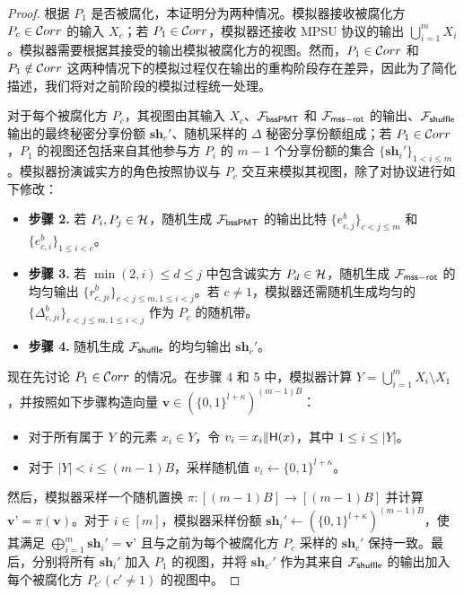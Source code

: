 \begin{proof}
根据 $P_1$ 是否被腐化，本证明分为两种情况。模拟器接收被腐化方 $P_c \in \mathcal{C}orr$ 的输入 $X_c$；若 $P_1 \in \mathcal{C}orr$，模拟器还接收 MPSU 协议的输出 $\bigcup_{i=1}^m X_i$。模拟器需要根据其接受的输出模拟被腐化方的视图。然而，$P_1 \in \mathcal{C}orr$ 和 $P_1 \notin \mathcal{C}orr$ 这两种情况下的模拟过程仅在输出的重构阶段存在差异，因此为了简化描述，我们将对之前阶段的模拟过程统一处理。

对于每个被腐化方 $P_c$，其视图由其输入 $X_c$、$\mathcal{F}_\mathsf{bssPMT}$ 和 $\mathcal{F}_\mathsf{mss\mathsf{-}rot}$ 的输出、$\mathcal{F}_\mathsf{shuffle}$ 输出的最终秘密分享份额 $\textbf{sh}_{c}'$、随机采样的 $\Delta$ 秘密分享份额组成；若 $P_1 \in \mathcal{C}orr$，$P_1$ 的视图还包括来自其他参与方 $P_i$ 的 $m-1$ 个分享份额的集合 $\{\textbf{sh}_{i}'\}_{1 < i \le m}$。模拟器扮演诚实方的角色按照协议与 $P_c$ 交互来模拟其视图，除了对协议进行如下修改：
\begin{itemize}
    \item \textbf{步骤 2.} 若 $P_i, P_j \in \mathcal{H}$，随机生成 $\mathcal{F}_\mathsf{bssPMT}$ 的输出比特 $\{e_{c,j}^b\}_{c < j \le m}$ 和 $\{e_{c,i}^b\}_{1 \le i < c}$。
    \item \textbf{步骤 3.} 若 $\min(2,i) \le d \le j$ 中包含诚实方 $P_d \in \mathcal{H}$，随机生成 $\mathcal{F}_\mathsf{mss\mathsf{-}rot}$ 的均匀输出 $\{r_{c,ji}^b\}_{c < j \le m, 1 \le i < j}$。若 $c \ne 1$，模拟器还需随机生成均匀的 $\{\Delta_{c,ji}^b\}_{c < j \le m, 1 \le i < j}$ 作为 $P_c$ 的随机带。
    \item \textbf{步骤 4.} 随机生成 $\mathcal{F}_\mathsf{shuffle}$ 的均匀输出 $\textbf{sh}_{c}'$。
\end{itemize}

现在先讨论 $P_1 \in \mathcal{C}orr$ 的情况。在步骤 4 和 5 中，模拟器计算 $Y = \bigcup_{i=1}^m X_i \setminus X_1$，并按照如下步骤构造向量 $\textbf{v} \in (\{0,1\}^{l+\kappa})^{(m-1)B}$：
\begin{itemize}
    \item 对于所有属于 $Y$ 的元素 $x_i \in Y$，令 $v_i = x_i \Vert \mathsf{H}(x)$，其中 $1 \le i \le \lvert Y \rvert$。
    \item 对于 $\lvert Y \rvert < i \le (m-1)B$，采样随机值 $v_i \gets \{0,1\}^{l+\kappa}$。
\end{itemize}
然后，模拟器采样一个随机置换 $\pi: [(m-1)B] \to [(m-1)B]$ 并计算 $\textbf{v'} = \pi(\textbf{v})$。对于 $i \in [m]$，模拟器采样份额 $\textbf{sh}_{i}' \gets (\{0,1\}^{l+\kappa})^{(m-1)B}$，使其满足 $\bigoplus_{i=1}^m \textbf{sh}_{i}' = \textbf{v'}$ 且与之前为每个被腐化方 $P_c$ 采样的 $\textbf{sh}_{c}'$ 保持一致。最后，分别将所有 $\textbf{sh}_{i}'$ 加入 $P_1$ 的视图，并将 $\textbf{sh}_{c'}'$ 作为其来自 $\mathcal{F}_\mathsf{shuffle}$ 的输出加入每个被腐化方 $P_{c'} (c' \ne 1)$ 的视图中。


\end{proof}
